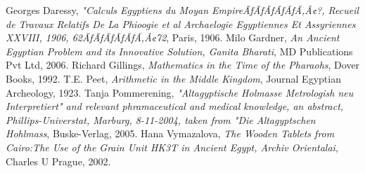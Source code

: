 \documentclass[12pt]{article}
\begin{document}
\begin{thebibliography}{6}

 Georges Daressy, \emph{"Calculs Egyptiens du Moyan EmpireÃƒÃƒÃƒÃƒÃƒÃ‚Â¢?, Recueil de Travaux Relatifs  De La  Phioogie et al Archaelogie Egyptiennes Et Assyriennes XXVIII, 1906, 62ÃƒÃƒÃƒÃƒÃƒÃ‚Â¢72}, Paris, 1906.
 Milo Gardner, \emph{An Ancient Egyptian Problem and its Innovative Solution, Ganita Bharati}, MD Publications Pvt Ltd, 2006.
Richard Gillings, \emph{Mathematics in the Time of the Pharaohs}, Dover Books, 1992.
 T.E. Peet, \emph{Arithmetic in the Middle Kingdom}, Journal Egyptian Archeology, 1923.
 Tanja Pommerening, \emph{"Altagyptische Holmasse Metrologish neu Interpretiert" and relevant phramaceutical and medical knowledge, an abstract,  Phillips-Universtat, Marburg, 8-11-2004, taken from "Die Altagyptschen Hohlmass}, Buske-Verlag, 2005.
 Hana Vymazalova, \emph{The Wooden Tablets from Cairo:The Use of the Grain Unit HK3T in Ancient Egypt, Archiv Orientalai}, Charles U Prague, 2002.
\end{thebibliography}


\end{document}
